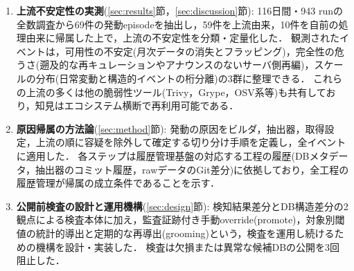 \documentclass{css}
\begin{document}
\begin{enumerate}
\item \textbf{上流不安定性の実測}(\ref{sec:results}節，\ref{sec:discussion}節):
116日間・943 runの全数調査から69件の発動episodeを抽出し，59件を上流由来，10件を自前の処理由来に帰属した上で，上流の不安定性を分類・定量化した．
観測されたイベントは，可用性の不安定(月次データの消失とフラッピング)，完全性の危うさ(遡及的な再キュレーションやアナウンスのないサーバ側再編)，スケールの分布(日常変動と構造的イベントの桁分離)の3群に整理できる．
これらの上流の多くは他の脆弱性ツール(Trivy，Grype，OSV系等)も共有しており，知見はエコシステム横断で再利用可能である．
\item \textbf{原因帰属の方法論}(\ref{sec:method}節):
発動の原因をビルダ，抽出器，取得設定，上流の順に容疑を除外して確定する切り分け手順を定義し，全イベントに適用した．
各ステップは履歴管理基盤\cite{nakaoka2025}の対応する工程の履歴(DBメタデータ，抽出器のコミット履歴，rawデータのGit差分)に依拠しており，全工程の履歴管理が帰属の成立条件であることを示す．
\item \textbf{公開前検査の設計と運用機構}(\ref{sec:design}節):
検知結果差分とDB構造差分の2観点による検査本体に加え，監査証跡付き手動override(promote)，対象別閾値の統計的導出と定期的な再導出(grooming)という，検査を運用し続けるための機構を設計・実装した．
検査は欠損または異常な候補DBの公開を3回阻止した．
\end{enumerate}
\end{document}

